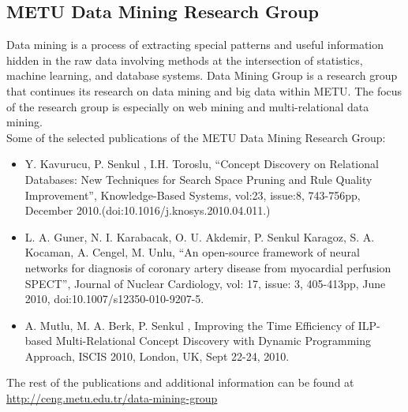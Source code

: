 \subsection{METU Data Mining Research Group}
Data mining is a process of extracting special patterns and useful information hidden in the raw data involving methods at the intersection of statistics, machine learning, and database systems.
Data Mining Group is a research group that continues its research on data mining and big data within METU.
The focus of the research group is especially on web mining and multi-relational data mining.\\

Some of the selected publications of the METU Data Mining Research Group:
\begin{itemize}
\item Y. Kavurucu, P. Senkul , I.H. Toroslu, “Concept Discovery on Relational Databases: New Techniques for Search Space Pruning and Rule Quality Improvement”, Knowledge-Based Systems, vol:23, issue:8, 743-756pp, December 2010.(doi:10.1016/j.knosys.2010.04.011.)
\item L. A. Guner, N. I. Karabacak, O. U. Akdemir, P. Senkul Karagoz, S. A. Kocaman, A. Cengel, M. Unlu, “An open-source framework of neural networks for diagnosis of coronary artery disease from myocardial perfusion SPECT”, Journal of Nuclear Cardiology, vol: 17, issue: 3, 405-413pp, June 2010, doi:10.1007/s12350-010-9207-5.
\item A. Mutlu, M. A. Berk, P. Senkul , Improving the Time Efficiency of ILP-based Multi-Relational Concept Discovery with Dynamic Programming Approach, ISCIS 2010, London, UK, Sept 22-24, 2010.
\end{itemize}
The rest of the publications and additional information can be found at \url{http://ceng.metu.edu.tr/data-mining-group}